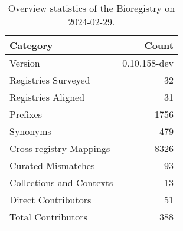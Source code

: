 \begin{table}
\caption{Overview statistics of the Bioregistry on 2024-02-29.}
\label{tab:bioregistry-summary}
\begin{tabular}{lr}
\toprule
Category & Count \\
\midrule
Version & 0.10.158-dev \\
Registries Surveyed & 32 \\
Registries Aligned & 31 \\
Prefixes & 1756 \\
Synonyms & 479 \\
Cross-registry Mappings & 8326 \\
Curated Mismatches & 93 \\
Collections and Contexts & 13 \\
Direct Contributors & 51 \\
Total Contributors & 388 \\
\bottomrule
\end{tabular}
\end{table}
